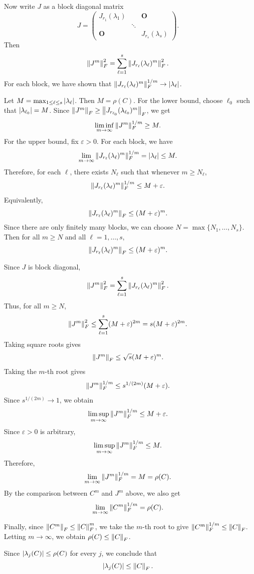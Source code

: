 \begin{pfbox}
Now write $J$ as a block diagonal matrix
\[
    J
    =
    \begin{pmatrix}
        J_{r_1}(\lambda_1) &        & \mathbf{O} \\
                           & \ddots &             \\
        \mathbf{O}         &        & J_{r_s}(\lambda_s)
    \end{pmatrix}.
\]
Then
\[
    \left\lVert J^m \right\rVert_F^2
    =
    \sum_{\ell=1}^s
    \left\lVert J_{r_\ell}(\lambda_\ell)^m \right\rVert_F^2.
\]
For each block, we have shown that
$\left\lVert J_{r_\ell}(\lambda_\ell)^m \right\rVert_F^{1/m}\to \left\lvert \lambda_\ell \right\rvert$.

Let $M=\max_{1\le \ell\le s}\left\lvert \lambda_\ell \right\rvert$. Then $M=\rho(C)$.
For the lower bound, choose $\ell_0$ such that $\left\lvert \lambda_{\ell_0} \right\rvert=M$.
Since $\left\lVert J^m \right\rVert_F\ge \left\lVert J_{r_{\ell_0}}(\lambda_{\ell_0})^m \right\rVert_F$, we get
\[
    \liminf_{m\to\infty}
    \left\lVert J^m \right\rVert_F^{1/m}
    \ge
    M.
\]
For the upper bound, fix $\varepsilon>0$. For each block, we have
\[
    \lim_{m\to\infty}
    \left\lVert J_{r_\ell}(\lambda_\ell)^m \right\rVert_F^{1/m}
    =
    \left\lvert \lambda_\ell \right\rvert
    \le
    M.
\]
Therefore, for each $\ell$, there exists $N_\ell$ such that whenever
$m\ge N_\ell$,
\[
    \left\lVert J_{r_\ell}(\lambda_\ell)^m \right\rVert_F^{1/m}
    \le
    M+\varepsilon.
\]
Equivalently,
\[
    \left\lVert J_{r_\ell}(\lambda_\ell)^m \right\rVert_F
    \le
    (M+\varepsilon)^m.
\]
Since there are only finitely many blocks, we can choose
$N=\max\{N_1,\ldots,N_s\}$. Then for all $m\ge N$ and all
$\ell=1,\ldots,s$,
\[
    \left\lVert J_{r_\ell}(\lambda_\ell)^m \right\rVert_F
    \le
    (M+\varepsilon)^m.
\]

Since $J$ is block diagonal,
\[
    \left\lVert J^m \right\rVert_F^2
    =
    \sum_{\ell=1}^s
    \left\lVert J_{r_\ell}(\lambda_\ell)^m \right\rVert_F^2.
\]
Thus, for all $m\ge N$,
\[
    \left\lVert J^m \right\rVert_F^2
    \le
    \sum_{\ell=1}^s (M+\varepsilon)^{2m}
    =
    s(M+\varepsilon)^{2m}.
\]
Taking square roots gives
\[
    \left\lVert J^m \right\rVert_F
    \le
    \sqrt{s}(M+\varepsilon)^m.
\]
Taking the $m$-th root gives
\[
    \left\lVert J^m \right\rVert_F^{1/m}
    \le
    s^{1/(2m)}(M+\varepsilon).
\]
Since $s^{1/(2m)}\to 1$, we obtain
\[
    \limsup_{m\to\infty}
    \left\lVert J^m \right\rVert_F^{1/m}
    \le
    M+\varepsilon.
\]
Since $\varepsilon>0$ is arbitrary,
\[
    \limsup_{m\to\infty}
    \left\lVert J^m \right\rVert_F^{1/m}
    \le
    M.
\]
Therefore,
\[
    \lim_{m\to\infty}
    \left\lVert J^m \right\rVert_F^{1/m}
    =
    M
    =
    \rho(C).
\]
By the comparison between $C^m$ and $J^m$ above, we also get
\[
    \lim_{m\to\infty}
    \left\lVert C^m \right\rVert_F^{1/m}
    =
    \rho(C).
\]

Finally, since $\left\lVert C^m \right\rVert_F\le \left\lVert C \right\rVert_F^m$, we take the $m$-th root to give
$\left\lVert C^m \right\rVert_F^{1/m}\le \left\lVert C \right\rVert_F$. Letting $m\to\infty$, we obtain
$\rho(C)\le \left\lVert C \right\rVert_F$.

Since $\left\lvert \lambda_j(C) \right\rvert\le \rho(C)$ for every $j$, we conclude that
\[
    \left\lvert \lambda_j(C) \right\rvert
    \le
    \left\lVert C \right\rVert_F.
\]
\end{pfbox}

